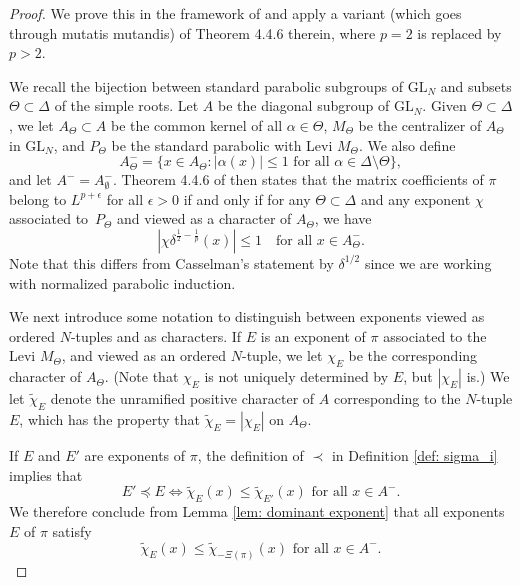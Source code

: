 \documentclass{amsart}
\newcommand{\GL}{\mathrm{GL}}
\newcommand{\1}{\m 1}
\theoremstyle{remark}
\theoremstyle{definition}
\numberwithin{equation}{subsection}
\begin{document}
\begin{proof}
We prove this in the framework of \cite[\S 4]{casselman1995introduction} and apply a variant (which goes through mutatis mutandis) of Theorem 4.4.6 therein, where $p=2$ is replaced by $p>2$. 

We recall the bijection between standard parabolic subgroups of $\GL_N$ and subsets $\Theta \subset \Delta$ of the simple roots.  Let $A$ be the diagonal subgroup of $\GL_N$.  Given $\Theta \subset \Delta$, we let $A_\Theta \subset A$ be the common kernel of all $\alpha \in \Theta$, $M_\Theta$ be the centralizer of $A_\Theta$ in $\GL_N$, and $P_\Theta$ be the standard parabolic with Levi $M_\Theta$.  We also define
\[
A_{\Theta}^-=\{x\in A_{\Theta} : |\alpha(x)|\leq 1 \text{ for all } \alpha \in \Delta \setminus \Theta\}, 
\] 
and let $A^- = A_\emptyset^-$.  Theorem 4.4.6 of \cite{casselman1995introduction} then states that the matrix coefficients of $\pi$ belong to $L^{p+\epsilon}$ for all $\epsilon>0$ if and only if for any $\Theta \subset \Delta$ and any exponent $\chi$ associated to~$P_{\Theta}$ and viewed as a character of $A_{\Theta}$, we have 
\begin{equation} \label{eq: Casselman thm}
\left|\chi\delta^{\frac{1}{2}-\frac{1}{p}}(x)\right| \leq 1 \quad \text{for all } x\in A_\Theta^{-}.
\end{equation}
Note that this differs from Casselman's statement by $\delta^{1/2}$ since we are working with normalized parabolic induction. 

We next introduce some notation to distinguish between exponents viewed as ordered $N$-tuples and as characters.  If $E$ is an exponent of $\pi$ associated to the Levi $M_\Theta$, and viewed as an ordered $N$-tuple, we let $\chi_E$ be the corresponding character of $A_\Theta$.  (Note that $\chi_E$ is not uniquely determined by $E$, but $|\chi_E|$ is.)  We let $\widetilde{\chi}_E$ denote the unramified positive character of $A$ corresponding to the $N$-tuple $E$, which has the property that $\widetilde{\chi}_E = |\chi_E|$ on $A_\Theta$.

If $E$ and $E'$ are exponents of $\pi$, the definition of $\prec$ in Definition \ref{def: sigma_i} implies that
\[
E' \preceq E \iff \widetilde{\chi}_E(x) \leq \widetilde{\chi}_{E'}(x) \text{ for all } x \in A^-. 
\] 
We therefore conclude from Lemma \ref{lem: dominant exponent} that all exponents $E$ of $\pi$ satisfy 
\[  
\widetilde{\chi}_E(x) \leq \widetilde{\chi}_{-\Xi(\pi)}(x) \text{ for all } x \in A^-.
\] 
\medskip


\end{proof}
\end{document}

